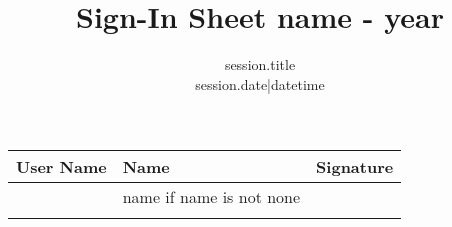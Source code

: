 \documentclass[14pt]{scrartcl}
\begin{document}
\title{Sign-In Sheet {{ name }} - {{ year }} }
\subtitle{ {{ session.title }} \\ {{ session.date|datetime }} }
\date{\vspace{-5ex}}
\author{\vspace{-5ex}}
\maketitle
\begin{tabularx}{\textwidth}{|l|l|X|}
  \hline
  User Name & Name & Signature \\
  \hline \hline
  {%
  \texttt{ {{ id }} }& {{ name if name is not none }} & \\
  \hline
{%
\end{tabularx}
\end{document}
